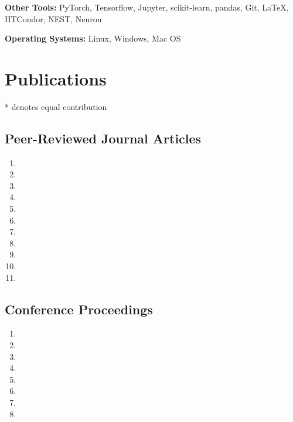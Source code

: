 \documentclass[10pt,letterpaper]{article}
\begin{document}
\hspace{1.5em}\textbf{Other Tools:} PyTorch, Tensorflow, Jupyter, scikit-learn, pandas, Git, \LaTeX, HTCondor, NEST, Neuron

\hspace{1.5em}\textbf{Operating Systems:} Linux, Windows, Mac OS

\clearpage

\section*{Publications}

* denotes equal contribution

\vspace{-0.05in}


\subsection*{Peer-Reviewed Journal Articles}

\begin{enumerate}
\item {}
\item {}
\item {}
\item {}
\item {}
\item {}
\item {}
\item {}
\item {}
\item {}
\item {}
\end{enumerate}

\subsection*{Conference Proceedings}

\begin{enumerate}[resume]
\item {}
\item {}
\item {}
\item {}
\item {}
\item {}
\item {}
\item {}
\end{enumerate}
\end{document}
